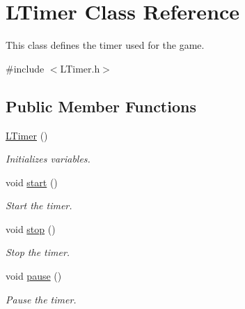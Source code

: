 \hypertarget{class_l_timer}{}\section{L\+Timer Class Reference}
\label{class_l_timer}


This class defines the timer used for the game.  




{\ttfamily \#include $<$L\+Timer.\+h$>$}

\subsection*{Public Member Functions}
\begin{DoxyCompactItemize}
\item 
\mbox{\label{class_l_timer_a95bb9588b09c253f331881fa5dd3ce62}} 
\mbox{\hyperlink{class_l_timer_a95bb9588b09c253f331881fa5dd3ce62}{L\+Timer}} ()
\begin{DoxyCompactList}\small\item\em Initializes variables. \end{DoxyCompactList}\item 
\mbox{\label{class_l_timer_a7dc11f05cf5098a6d06ebd6ebec96ed6}} 
void \mbox{\hyperlink{class_l_timer_a7dc11f05cf5098a6d06ebd6ebec96ed6}{start}} ()
\begin{DoxyCompactList}\small\item\em Start the timer. \end{DoxyCompactList}\item 
\mbox{\label{class_l_timer_aeabbf5f935907fcfeaa7f4403741e4ae}} 
void \mbox{\hyperlink{class_l_timer_aeabbf5f935907fcfeaa7f4403741e4ae}{stop}} ()
\begin{DoxyCompactList}\small\item\em Stop the timer. \end{DoxyCompactList}\item 
\mbox{\label{class_l_timer_a8a6c6af5435bdaa825a30f84877dc059}} 
void \mbox{\hyperlink{class_l_timer_a8a6c6af5435bdaa825a30f84877dc059}{pause}} ()
\begin{DoxyCompactList}\small\item\em Pause the timer. \end{DoxyCompactList}\item 

\end{DoxyCompactItemize}
